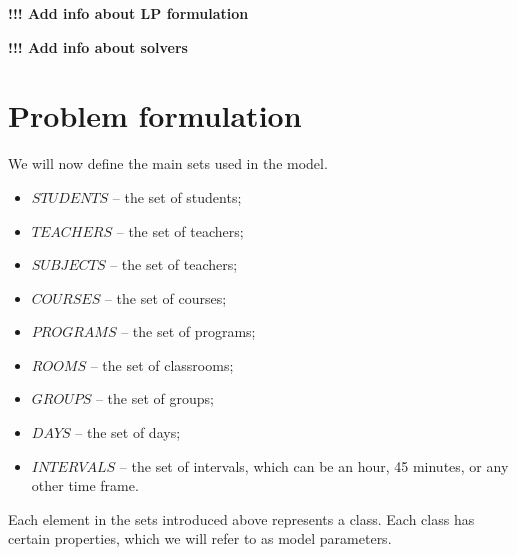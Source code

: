 \documentclass{article}
\begin{document}
\textbf{!!! Add info about LP formulation}

\textbf{!!! Add info about solvers}

\section{Problem formulation}

We will now define the main sets used in the model.

\begin{itemize}
  \setlength\itemsep{0.05em}
    \item $STUDENTS$ -- the set of students;
    \item $TEACHERS$ -- the set of teachers;
    \item $SUBJECTS$ -- the set of teachers;
    \item $COURSES$ -- the set of courses;
    \item $PROGRAMS$ -- the set of programs;
    \item $ROOMS$ -- the set of classrooms;
    \item $GROUPS$ -- the set of groups;
    \item $DAYS$ -- the set of days;
    \item $INTERVALS$ -- the set of intervals, which can be an hour, 45 minutes, or any other time frame.
\end{itemize}

Each element in the sets introduced above represents a class. Each class has certain properties, which we will refer to as model parameters.
\end{document}
